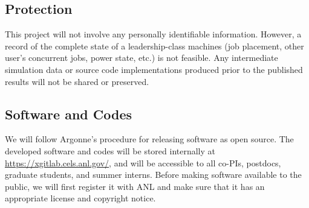 \subsection*{Protection}
This project will not involve any personally identifiable information. However,
a record of the complete state of a leadership-class machines (job placement,
other user's concurrent jobs, power state, etc.) is not feasible.
Any intermediate simulation data or source code implementations produced prior
to the published results will not be shared or preserved.


\subsection*{Software and Codes}

We will follow Argonne's procedure for releasing software as open source.
The developed software and codes will be stored internally at
\url{https://xgitlab.cels.anl.gov/}, and will be accessible to
all co-PIs, postdocs, graduate students, and summer interns.
Before making software available to the public, we will first register it with
ANL and make sure that it has an appropriate license and copyright notice.
